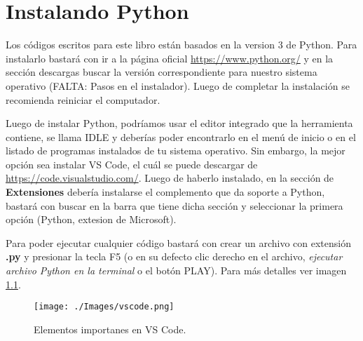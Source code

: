 \chapter{Instalando Python}
\label{chap:instalacion-python}

Los códigos escritos para este libro están basados en la version 3 de Python. Para instalarlo bastará con ir a la página oficial \url{https://www.python.org/} y en la sección descargas buscar la versión correspondiente para nuestro sistema operativo (FALTA: Pasos en el instalador). Luego de completar la instalación se recomienda reiniciar el computador.

Luego de instalar Python, podríamos usar el editor integrado que la herramienta contiene, se llama IDLE y deberías poder encontrarlo en el menú de inicio o en el listado de programas instalados de tu sistema operativo. Sin embargo, la mejor opción sea instalar VS Code, el cuál se puede descargar de \url{https://code.visualstudio.com/}. Luego de haberlo instalado, en la sección de \textbf{Extensiones} debería instalarse el complemento que da soporte a Python, bastará con buscar en la barra que tiene dicha sección y seleccionar la primera opción (Python, extesion de Microsoft).

Para poder ejecutar cualquier código bastará con crear un archivo con extensión \textbf{.py} y presionar la tecla F5 (o en su defecto clic derecho en el archivo, \emph{ejecutar archivo Python en la terminal} o el botón PLAY). Para más detalles ver imagen \ref{vscode}.

\begin{figure}[h!]
	\centering
	\texttt{[image: ./Images/vscode.png]}
	\caption{Elementos importanes en VS Code.}
	\label{vscode}
\end{figure}